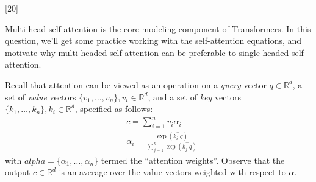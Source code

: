 \graphicspath{ {images/} }

[20]
\label{sec:analysis}

Multi-head self-attention is the core modeling component of Transformers.
In this question, we'll get some practice working with the self-attention equations, and motivate why multi-headed self-attention can be preferable to single-headed self-attention.

Recall that attention can be viewed as an operation on a \textit{query} vector $q\in\mathbb{R}^d$, a set of \textit{value} vectors $\{v_1,\dots,v_n\}, v_i\in\mathbb{R}^d$, and a set of \textit{key} vectors $\{k_1,\dots,k_n\}, k_i \in \mathbb{R}^d$, specified as follows:
\begin{align}
&c = \sum_{i=1}^{n} v_i \alpha_i \\
&\alpha_i = \frac{\exp(k_i^\top q)}{\sum_{j=1}^{n} \exp(k_j^\top q)}
\end{align} 
with $alpha = \{\alpha_1, \ldots, \alpha_n\}$ termed the ``attention weights''. 
Observe that the output $c\in\mathbb{R}^d$ is an average over the value vectors weighted with respect to $\alpha$.

